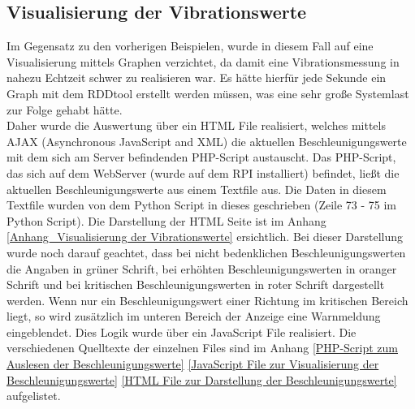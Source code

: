 \subsection{Visualisierung der Vibrationswerte}
\label{subsection_Visualisierung der Vibrationswerte}
Im Gegensatz zu den vorherigen Beispielen, wurde in diesem Fall auf eine Visualisierung mittels Graphen verzichtet, da damit eine Vibrationsmessung in nahezu Echtzeit schwer zu realisieren war. Es hätte hierfür jede Sekunde ein Graph mit dem RDDtool erstellt werden müssen, was eine sehr große Systemlast zur Folge gehabt hätte.\\
Daher wurde die Auswertung über ein HTML File realisiert, welches mittels AJAX (Asynchronous JavaScript and XML) die aktuellen Beschleunigungswerte mit dem sich am Server befindenden PHP-Script austauscht. Das PHP-Script, das sich auf dem WebServer (wurde auf dem \ac{RPI} installiert) befindet, ließt die aktuellen Beschleunigungswerte aus einem Textfile aus. Die Daten in diesem Textfile wurden von dem Python Script in dieses geschrieben (Zeile 73 - 75 im Python Script). Die Darstellung der HTML Seite ist im Anhang \ref{Anhang_Visualisierung der Vibrationswerte} ersichtlich. Bei dieser Darstellung wurde noch darauf geachtet, dass bei nicht bedenklichen Beschleunigungswerten die Angaben in grüner Schrift, bei erhöhten Beschleunigungswerten in oranger Schrift und bei kritischen Beschleunigungswerten in roter Schrift dargestellt werden. Wenn nur ein Beschleunigungswert einer Richtung im kritischen Bereich liegt, so wird zusätzlich im unteren Bereich der Anzeige eine Warnmeldung eingeblendet. Dies Logik wurde über ein JavaScript File realisiert. Die verschiedenen Quelltexte der einzelnen Files sind im Anhang   \ref{PHP-Script zum Auslesen der Beschleunigungswerte} \ref{JavaScript File zur Visualisierung der Beschleunigungswerte} \ref{HTML File zur Darstellung der Beschleunigungswerte} aufgelistet. 